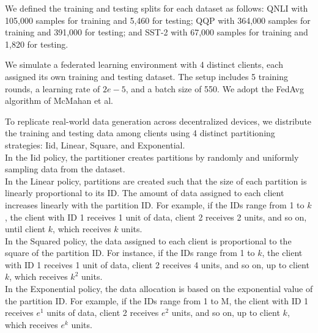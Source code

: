  
We defined the training and testing splits for each dataset as follows: QNLI with 105,000 samples for training and 5,460 for testing; QQP with 364,000 samples for training and 391,000 for testing; and SST-2 with 67,000 samples for training and 1,820 for testing.

 
We simulate a federated learning environment with 4 distinct clients, each assigned its own training and testing dataset. The setup includes 5 training rounds, a learning rate of \( 2e-5 \), and a batch size of 550. We adopt the FedAvg algorithm of McMahan et al. \cite{mcmahan2017communication}
 
To replicate real-world data generation across decentralized devices, we distribute the training and testing data among clients using 4 distinct partitioning strategies: Iid, Linear, Square, and Exponential.\\
In the Iid policy, the partitioner creates partitions by randomly and uniformly sampling data from the dataset. \\In the Linear policy, partitions are created such that the size of each partition is linearly proportional to its ID. The amount of data assigned to each client increases linearly with the partition ID. For example, if the IDs range from 1 to \( k\), the client with ID 1 receives 1 unit of data, client 2 receives 2 units, and so on, until client \( k\), which receives \( k\) units.\\
In the Squared policy, the data assigned to each client is proportional to the square of the partition ID. For instance, if the IDs range from 1 to \( k\), the client with ID 1 receives 1 unit of data, client 2 receives 4 units, and so on, up to client \( k\), which receives \(k^2\) units.\\
In the Exponential policy, the data allocation is based on the exponential value of the partition ID. For example, if the IDs range from 1 to M, the client with ID 1 receives \(e^1\) units of data, client 2 receives \(e^2\) units, and so on, up to client \( k\), which receives \(e^k\) units.
 
